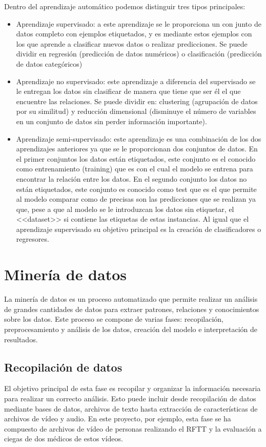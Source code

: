 Dentro del aprendizaje automático podemos distinguir tres tipos principales:
\begin{itemize}
\item Aprendizaje supervisado: a este aprendizaje se le proporciona un con junto de datos completo con ejemplos etiquetados, y es mediante estos ejemplos con los que aprende a clasificar nuevos datos o realizar predicciones. Se puede dividir en regresión (predicción de datos numéricos) o clasificación (predicción de datos categóricos)
\item Aprendizaje no supervisado: este aprendizaje a diferencia del supervisado se le entregan los datos sin clasificar de manera que tiene que ser él el que encuentre las relaciones. Se puede dividir en: clustering (agrupación de datos por su similitud) y reducción dimensional (disminuye el número de variables en un conjunto de datos sin perder información importante).
\item Aprendizaje semi-supervisado: este aprendizaje es una combinación de los dos aprendizajes anteriores ya que se le proporcionan dos conjuntos de datos. En el primer conjuntos los datos están etiquetados, este conjunto es el conocido como entrenamiento (training) que es con el cual el modelo se entrena para encontrar la relación entre los datos. En el segundo conjunto los datos no están etiquetados, este conjunto es conocido como test que es el que permite al modelo comparar como de precisas son las predicciones que se realizan ya que, pese a que al modelo se le introduzcan los datos sin etiquetar, el <<dataset>> si contiene las etiquetas de estas instancias. Al igual que el aprendizaje supervisado su objetivo principal es la creación de clasificadores o regresores.
\end{itemize}

\section{Minería de datos}

La minería de datos es un proceso automatizado que permite realizar un análisis de grandes cantidades de datos para extraer patrones, relaciones y conocimientos sobre los datos. Este proceso se compone de varias fases: recopilación, preprocesamiento y análisis de los datos, creación del modelo e interpretación de resultados.

\subsection{Recopilación de datos}
El objetivo principal de esta fase es recopilar y organizar la información necesaria para realizar un correcto análisis. Esto puede incluir desde recopilación de datos mediante bases de datos, archivos de texto hasta extracción de características de archivos de vídeo y audio. En este proyecto, por ejemplo, esta fase se ha compuesto de archivos de vídeo de personas realizando el RFTT y la evaluación a ciegas de dos médicos de estos vídeos.


